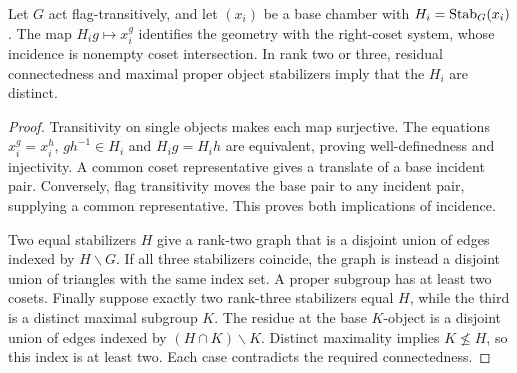 \documentclass[11pt,a4paper]{article}
\begin{document}
\begin{lemma}\label{lem:realize}
Let $G$ act flag-transitively, and let $(x_i)$ be a base chamber with $H_i=\operatorname{Stab}_G(x_i)$. The map $H_i g\mapsto x_i^g$ identifies the geometry with the right-coset system, whose incidence is nonempty coset intersection. In rank two or three, residual connectedness and maximal proper object stabilizers imply that the $H_i$ are distinct.
\end{lemma}
\begin{proof}
Transitivity on single objects makes each map surjective. The equations $x_i^g=x_i^h$, $gh^{-1}\in H_i$ and $H_i g=H_i h$ are equivalent, proving well-definedness and injectivity. A common coset representative gives a translate of a base incident pair. Conversely, flag transitivity moves the base pair to any incident pair, supplying a common representative. This proves both implications of incidence.

Two equal stabilizers $H$ give a rank-two graph that is a disjoint union of edges indexed by $H\backslash G$. If all three stabilizers coincide, the graph is instead a disjoint union of triangles with the same index set. A proper subgroup has at least two cosets. Finally suppose exactly two rank-three stabilizers equal $H$, while the third is a distinct maximal subgroup $K$. The residue at the base $K$-object is a disjoint union of edges indexed by $(H\cap K)\backslash K$. Distinct maximality implies $K\not\leq H$, so this index is at least two. Each case contradicts the required connectedness.
\end{proof}
\end{document}
